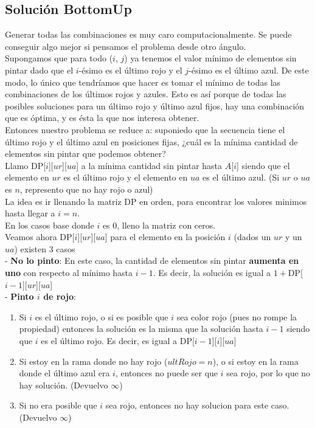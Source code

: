 \subsection{Solución BottomUp}

Generar todas las combinaciones es muy caro computacionalmente. Se puede conseguir algo mejor si pensamos el problema desde otro ángulo. \\

Supongamos que para todo ($i$, $j$) ya tenemos el valor mínimo de elementos sin pintar dado que el $i$-ésimo es el último rojo y el $j$-ésimo es el último azul. De este modo, lo único que tendríamos que hacer es tomar el mínimo de todas las combinaciones de los últimos rojos y azules. Esto es así porque de todas las posibles soluciones para un último rojo y último azul fijos, hay una combinación que es óptima, y es ésta la que nos interesa obtener. \\

Entonces nuestro problema se reduce a: suponiedo que la secuencia tiene el último rojo y el último azul en posiciones fijas, ¿cuál es la mínima cantidad de elementos sin pintar que podemos obtener? \\

Llamo DP[$i$][$ur$][$ua$] a la mínima cantidad sin pintar hasta $A$[$i$] siendo que el elemento en $ur$ es el último rojo y el elemento en $ua$ es el último azul. (Si $ur$ o $ua$ es $n$, represento que no hay rojo o azul) \\

La idea es ir llenando la matriz DP en orden, para encontrar los valores minimos hasta llegar a $i = n$. \\

En los casos base donde $i$ es 0, lleno la matriz con ceros. \\

Veamos ahora DP[$i$][$ur$][$ua$] para el elemento en la posición $i$ (dados un $ur$ y un $ua$) existen 3 casos \\

- \textbf{No lo pinto}: En este caso, la cantidad de elementos sin pintar \textbf{aumenta en uno} con respecto al mínimo hasta $i-1$. Es decir, la solución es igual a $1 + $DP[$i-1$][$ur$][$ua$] \\

- \textbf{Pinto $i$ de rojo}: 
\begin{enumerate}
\item Si $i$ es el último rojo, o si es posible que $i$ sea color rojo (pues no rompe la propiedad) entonces la solución es la misma que la solución hasta $i-1$ siendo que $i$ es el último rojo. Es decir, es igual a DP[$i-1$][$i$][$ua$]
\item Si estoy en la rama donde no hay rojo ($ultRojo = n$), o si estoy en la rama donde el último azul era $i$, entonces no puede ser que $i$ sea rojo, por lo que no hay solución. (Devuelvo $\infty$)
\item Si no era posible que $i$ sea rojo, entonces no hay solucion para este caso. (Devuelvo $\infty$)
\end{enumerate} 

